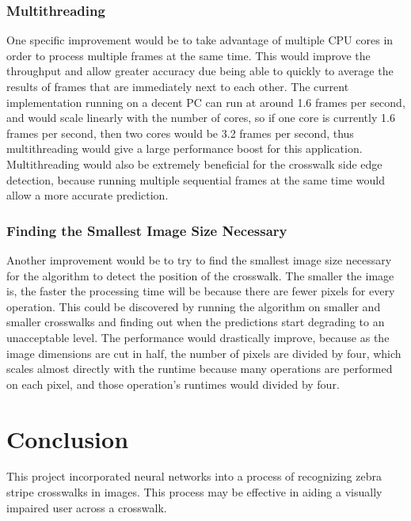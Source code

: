 \documentclass[12pt]{ucthesis}
\begin{document}
\subsection{Multithreading}
One specific improvement would be to take advantage of multiple CPU cores in order to process multiple frames at the same time. This would improve the throughput and allow greater accuracy due being able to quickly to average the results of frames that are immediately next to each other.
The current implementation running on a decent PC can run at around 1.6 frames per second, and would scale linearly with the number of cores, so if one core is currently 1.6 frames per second, then two cores would be 3.2 frames per second, thus multithreading would give a large performance boost for this application. Multithreading would also be extremely beneficial for the crosswalk side edge detection, because running multiple sequential frames at the same time would allow a more accurate prediction.

\subsection{Finding the Smallest Image Size Necessary}
Another improvement would be to try to find the smallest image size necessary for the algorithm to detect the position of the crosswalk. The smaller the image is, the faster the processing time will be because there are fewer pixels for every operation. This could be discovered by running the algorithm on smaller and smaller crosswalks and finding out when the predictions start degrading to an unacceptable level. The performance would drastically improve, because as the image dimensions are cut in half, the number of pixels are divided by four, which scales almost directly with the runtime because many operations are performed on each pixel, and those operation's runtimes would divided by four. 

\chapter{Conclusion}
\label{conclusion}

This project incorporated neural networks into a process of recognizing zebra stripe crosswalks in images. This process may be effective in aiding a visually impaired user across a crosswalk. 
\end{document}
